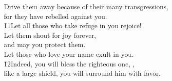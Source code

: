 \begin{poetry}
\poeml Drive them away because of their many transgressions, \\
\poemll    for they have rebelled against you. \\
\poeml \v{11}Let all those who take refuge in you rejoice! \\
\poemll    Let them shout for joy forever, \\
\poeml and may you protect them. \\
\poemll    Let those who love your name exult in you. \\
\poeml \v{12}Indeed, you will bless the righteous one, , \\
\poemll    like a large shield, you will surround him with favor.
\end{poetry}

